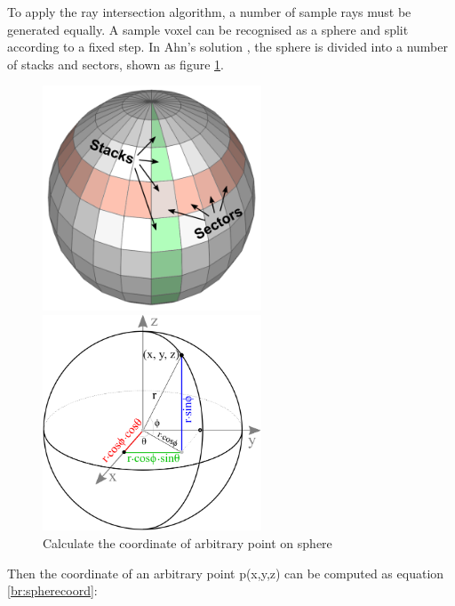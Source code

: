 To apply the ray intersection algorithm, a number of sample rays must be generated equally. A sample voxel can be recognised as a sphere and split according to a fixed step. In Ahn's solution \cite{glsphere}, the sphere is divided into a number of stacks and sectors, shown as figure \ref{br:sphere}.

\begin{figure}[htbp]
    \centering
    \subfigure
    {
        \begin{minipage}[b]{.45\linewidth}
            \centering
            \includegraphics[width=6.5cm]{Images/Chap2/gl_sphere02.png}
        \end{minipage}
    }
    \subfigure
    {
         \begin{minipage}[b]{.45\linewidth}
            \centering
            \includegraphics[width=6.5cm]{Images/Chap2/gl_sphere01.png}
        \end{minipage}
    }
    \caption{Calculate the coordinate of arbitrary point on sphere}
    \label{br:sphere}
\end{figure}

\clearpage

Then the coordinate of an arbitrary point p(x,y,z) can be computed as equation \ref{br:spherecoord}:


